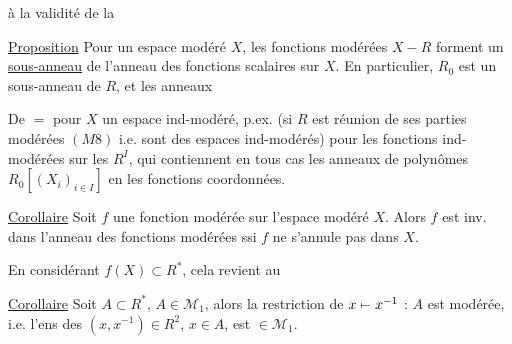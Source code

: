     à la validité de la


\uline{Proposition} Pour un espace modéré $X$, les fonctions modérées $X\mathbin{-}R$  forment un \uline{sous-anneau} de l'anneau des fonctions scalaires sur $X$. En particulier, $R_0$ est un sous-anneau de $R$, et les anneaux

De $=$ pour $X$ un espace ind-modéré, p.ex. (si $R$ est réunion  de ses parties modérées $(M8)$ i.e.  sont des espaces ind-modérés) pour les fonctions ind-modérées sur les $R^I$, qui contiennent en tous cas les  anneaux de polynômes $R_0[(X_i)_{i\in I}]$ en les fonctions coordonnées.


\uline{Corollaire} Soit $f$ une fonction modérée sur l'espace modéré $X$. Alors $f$ est inv. dans l'anneau des fonctions modérées ssi $f$ ne s'annule pas dans $X$.

En considérant $f(X)\subset R^*$, cela revient au

\uline{Corollaire} Soit $A\subset R^*$, $A\in\mathcal M_1$, alors la restriction de $x\mathrel{\mapstochar\relbar}x^{-1}$ : $A$ est modérée, i.e. l'ens des $(x,x^{-1})\in R^2$, $x\in A$, est $\in\mathcal M_1$.
